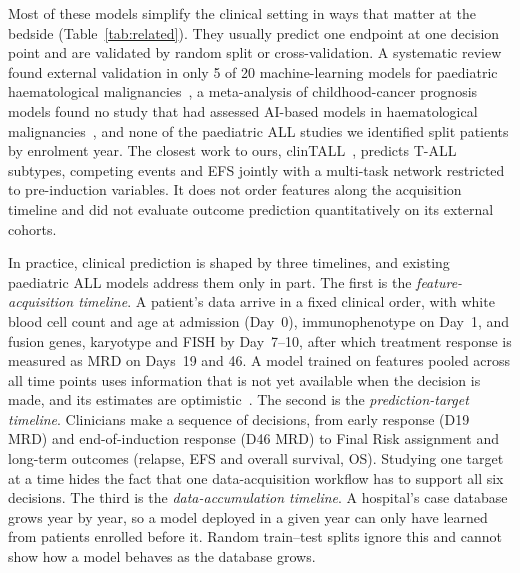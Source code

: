 \documentclass[pdflatex,sn-nature]{sn-jnl}
\begin{document}
Most of these models simplify the clinical setting in ways that matter
at the bedside (Table~\ref{tab:related}).
They usually predict one endpoint at one decision point and are
validated by random split or cross-validation.
A systematic review found external validation in only 5 of 20
machine-learning models for paediatric haematological
malignancies~\cite{[CITE:Gurumurthy2025]}, a meta-analysis of
childhood-cancer prognosis models found no study that had assessed
AI-based models in haematological malignancies~\cite{[CITE:Varga2024]},
and none of the paediatric ALL studies we identified split patients by
enrolment year.
The closest work to ours, clinTALL~\cite{[CITE:Stoiber2026]}, predicts
T-ALL subtypes, competing events and EFS jointly with a multi-task
network restricted to pre-induction variables.
It does not order features along the acquisition timeline and did not
evaluate outcome prediction quantitatively on its external cohorts.

In practice, clinical prediction is shaped by three timelines, and
existing paediatric ALL models address them only in part.
The first is the \emph{feature-acquisition timeline}.
A patient's data arrive in a fixed clinical order, with white blood
cell count and age at admission (Day~0), immunophenotype on Day~1, and
fusion genes, karyotype and FISH by Day~7--10, after which treatment
response is measured as MRD on Days~19 and 46.
A model trained on features pooled across all time points uses
information that is not yet available when the decision is made, and
its estimates are optimistic~\cite{[CITE:Steyerberg2019]}.
The second is the \emph{prediction-target timeline}.
Clinicians make a sequence of decisions, from early response (D19 MRD)
and end-of-induction response (D46 MRD) to Final Risk assignment and
long-term outcomes (relapse, EFS and overall survival, OS).
Studying one target at a time hides the fact that one
data-acquisition workflow has to support all six decisions.
The third is the \emph{data-accumulation timeline}.
A hospital's case database grows year by year, so a model deployed in
a given year can only have learned from patients enrolled before it.
Random train--test splits ignore this and cannot show how a model
behaves as the database grows.
\end{document}
